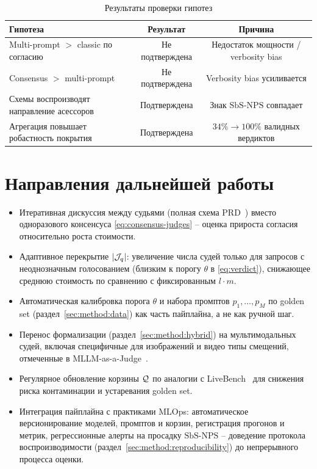 \begin{table}[htbp]
\centering
\caption{Результаты проверки гипотез}
\label{tab:hypotheses-summary}
\begin{tabular}{p{5cm}cc}
\toprule
Гипотеза & Результат & Причина \\
\midrule
Multi-prompt $>$ classic по согласию & Не подтверждена & Недостаток мощности / verbosity bias \\
Consensus $>$ multi-prompt & Не подтверждена & Verbosity bias усиливается \\
Схемы воспроизводят направление асессоров & Подтверждена & Знак $\mathrm{SbS\text{-}NPS}$ совпадает \\
Агрегация повышает робастность покрытия & Подтверждена & $34\% \to 100\%$ валидных вердиктов \\
\bottomrule
\end{tabular}
\end{table}

\section{Направления дальнейшей работы}

\begin{itemize}
    \item Итеративная дискуссия между судьями (полная схема
        PRD~\cite{li2023prd}) вместо одноразового консенсуса
        \eqref{eq:consensus-judges} -- оценка прироста согласия
        относительно роста стоимости.
    \item Адаптивное перекрытие $\left\lvert\mathcal{J}_q\right\rvert$: увеличение числа
        судей только для запросов с неоднозначным голосованием (близким
        к порогу $\theta$ в \eqref{eq:verdict}), снижающее среднюю
        стоимость по сравнению с фиксированным $l \cdot m$.
    \item Автоматическая калибровка порога $\theta$ и набора промптов
        $p_1, \dots, p_M$ по golden set
        (раздел~\ref{sec:method:data}) как часть пайплайна, а не как
        ручной шаг.
    \item Перенос формализации
        (раздел~\ref{sec:method:hybrid}) на мультимодальных судей,
        включая специфичные для изображений и видео типы смещений,
        отмеченные в MLLM-as-a-Judge~\cite{chen2024mllmjudge}.
    \item Регулярное обновление корзины $\mathcal{Q}$ по аналогии с
        LiveBench~\cite{white2024livebench} для снижения риска
        контаминации и устаревания golden set.
    \item Интеграция пайплайна с практиками MLOps: автоматическое
        версионирование моделей, промптов и корзин, регистрация прогонов
        и метрик, регрессионные алерты на просадку
        $\mathrm{SbS\text{-}NPS}$ -- доведение протокола
        воспроизводимости (раздел~\ref{sec:method:reproducibility}) до
        непрерывного процесса оценки.
\end{itemize}

